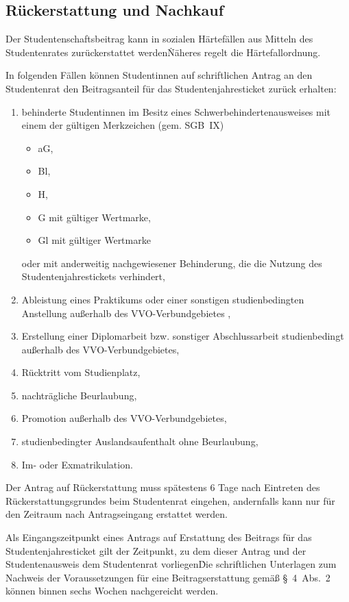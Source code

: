 \begin{multicols}{2}
\section{Rückerstattung und Nachkauf}

\Abs \Satz  Der Studentenschaftsbeitrag kann in sozialen Härtefällen aus Mitteln des Studentenrates zurückerstattet werden\. Näheres regelt die Härtefallordnung. 

\Abs \Satz  In folgenden Fällen können Studentinnen auf schriftlichen Antrag an den Studentenrat den Beitragsanteil für das Studentenjahresticket zurück erhalten:
\begin{enumerate}
\item behinderte Studentinnen im Besitz eines Schwerbehindertenausweises mit einem der gültigen Merkzeichen (gem. SGB~IX)
\renewcommand{\labelitemi}{—}
\begin{itemize}
\item aG,
\item Bl,
\item H,
\item G mit gültiger Wertmarke,
\item Gl mit gültiger Wertmarke
\end{itemize}
oder mit anderweitig nachgewiesener Behinderung, die die Nutzung des Studentenjahrestickets verhindert,
\item Ableistung eines Praktikums oder einer sonstigen studienbedingten Anstellung außerhalb des VVO-Verbundgebietes ,
\item Erstellung einer Diplomarbeit bzw. sonstiger Abschlussarbeit studienbedingt außerhalb des VVO-Verbundgebietes,
\item Rücktritt vom Studienplatz,
\item nachträgliche Beurlaubung,
\item Promotion außerhalb des VVO-Verbundgebietes,
\item studienbedingter Auslandsaufenthalt ohne Beurlaubung, 
\item Im- oder Exmatrikulation.
\end{enumerate}

\Abs \Satz  Der Antrag auf Rückerstattung muss spätestens 6 Tage nach Eintreten des Rückerstattungsgrundes beim Studentenrat eingehen, andernfalls kann nur für den Zeitraum nach Antragseingang erstattet werden. 

\Abs \Satz   Als Eingangszeitpunkt eines Antrags auf Erstattung des Beitrags für das Studentenjahresticket gilt der Zeitpunkt, zu dem dieser Antrag und der Studentenausweis dem Studentenrat vorliegen\. Die schriftlichen Unterlagen zum Nachweis der Voraussetzungen für eine Beitragserstattung gemäß §~4~Abs.~2 können binnen sechs Wochen nachgereicht werden. 


\end{multicols}
